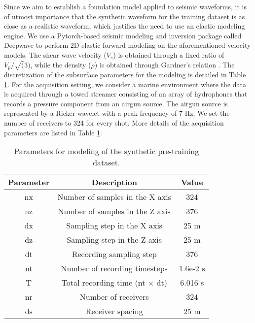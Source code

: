 Since we aim to establish a foundation model applied to seismic waveforms, it is of utmost importance that the synthetic waveform for the training dataset is as close as a realistic waveform, which justifies the need to use an elastic modeling engine. We use a Pytorch-based seismic modeling and inversion package called Deepwave \citep{richardson_alan_2023} to perform 2D elastic forward modeling on the aforementioned velocity models. The shear wave velocity ($V_s$) is obtained through a fixed ratio of $V_p /\sqrt(3)$, while the density ($\rho$) is obtained through Gardner's relation \citep{gardner1974formation}. The discretization of the subsurface parameters for the modeling is detailed in Table \ref{tab1}. For the acquisition setting, we consider a marine environment where the data is acquired through a towed streamer consisting of an array of hydrophones that records a pressure component from an airgun source. The airgun source is represented by a Ricker wavelet with a peak frequency of 7 Hz. We set the number of receivers to 324 for every shot. More details of the acquisition parameters are listed in Table \ref{tab1}.

\begin{table}[]
    \centering
    \caption{Parameters for modeling of the synthetic pre-training dataset.}
    \begin{tabular}{ccc}
         \toprule
         Parameter &  Description & Value \\
         \midrule
         nx & Number of samples in the X axis & 324 \\
         nz & Number of samples in the Z axis & 376 \\
         dx & Sampling step in the X axis & 25 m \\
         dz & Sampling step in the Z axis & 25 m\\
         dt & Recording sampling step & 376 \\
         nt & Number of recording timesteps & 1.6e-2 s \\
         T & Total recording time (nt $\times$ dt) & 6.016 s \\
         nr & Number of receivers & 324 \\
         ds & Receiver spacing  & 25 m \\
         \bottomrule
    \end{tabular}
    \label{tab1}
\end{table}

